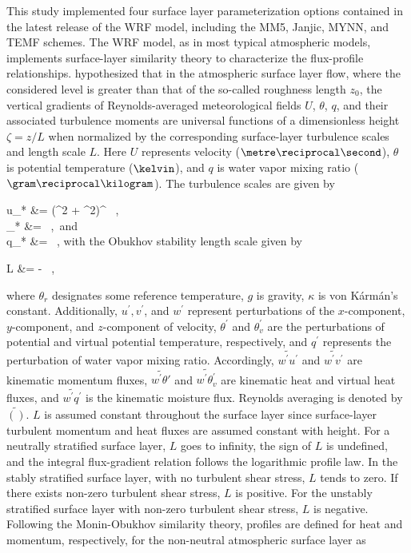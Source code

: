 This study implemented four surface layer parameterization options contained in the latest release of the WRF model, including the MM5, Janjic, MYNN, and TEMF schemes. The WRF model, as in most typical atmospheric models, implements surface-layer similarity theory to characterize the flux-profile relationships.  \citet{MO} hypothesized that in the atmospheric surface layer flow, where the considered level is greater than that of the so-called roughness length $z_0$, the vertical gradients of Reynolds-averaged meteorological fields $U$, $\theta$, $q$, and their associated turbulence moments are universal functions of a dimensionless height $\zeta=z/L$ when normalized by the corresponding surface-layer turbulence scales and length scale $L$. Here $U$ represents velocity ($\metre\reciprocal\second$), $\theta$ is potential temperature ($\kelvin$), and $q$ is water vapor mixing ratio ($\gram\reciprocal\kilogram$). The turbulence scales are given by


\bse \label{equation315}
\bal
u_* &= (^2 + ^2)^{} \mbox{ ,} \label{equation315a} \\
\theta_* &=  \mbox{ , \quad and} \label{equation315b}\\
q_* &=  \mbox{ ,} \label{equation315c}
\eal
\ese
\noindent
 with the Obukhov stability length scale given by

\bse \label{equation316}
\bal
L &= - \mbox{ ,} 
\eal
\ese
\noindent

where $\theta_r$ designates some reference temperature, $g$ is gravity, $\kappa$ is von K\'{a}rm\'{a}n's constant. Additionally, $u^{'},v^{'}$, and $w^{'}$ represent perturbations of the $x$-component, $y$-component, and $z$-component of velocity, $\theta^{'}$ and $\theta_v^{'}$ are the perturbations of potential and virtual potential temperature, respectively, and $q^{'}$ represents the perturbation of water vapor mixing ratio. Accordingly, $\widetilde{w^{'}u^{'}}$ and $\widetilde{w^{'}v^{'}}$ are kinematic momentum fluxes, $\widetilde{w^{'}\theta{'}}$ and $\widetilde{w^{'}\theta_v^{'}}$ are kinematic heat and virtual heat fluxes, and $\widetilde{w^{'}q^{'}}$ is the kinematic moisture flux. Reynolds averaging is denoted by $\widetilde{()}$. $L$ is assumed constant throughout the surface layer since surface-layer turbulent momentum and heat fluxes are assumed constant with height. For a neutrally stratified surface layer, $L$ goes to infinity, the sign of $L$ is undefined, and the integral flux-gradient relation follows the logarithmic profile law. In the stably stratified surface layer, with no turbulent shear stress, $L$ tends to zero. If there exists non-zero turbulent shear stress, $L$ is positive. For the unstably stratified surface layer with non-zero turbulent shear stress, $L$ is negative. Following the Monin-Obukhov similarity theory, profiles are defined for heat and momentum, respectively, for the non-neutral atmospheric surface layer as
 
